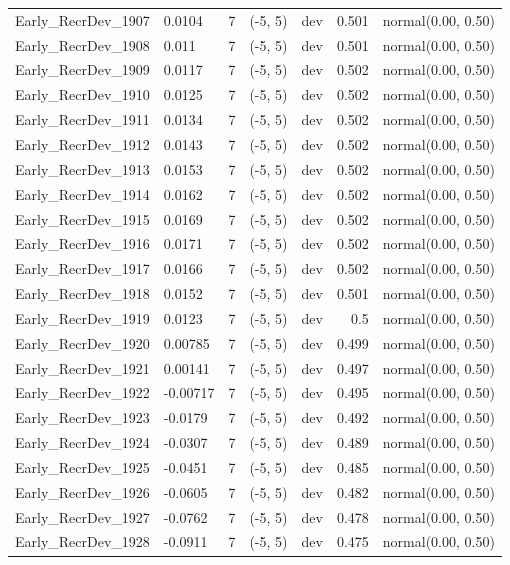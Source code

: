 \documentclass[
]{scrartcl}
\begin{document}
\begin{landscape}
\begin{longtable}{llrllrl}
Early\_RecrDev\_1907 & 0.0104 & 7 & (-5, 5) & dev & 0.501 & normal(0.00, 0.50) \\ 
Early\_RecrDev\_1908 & 0.011 & 7 & (-5, 5) & dev & 0.501 & normal(0.00, 0.50) \\ 
Early\_RecrDev\_1909 & 0.0117 & 7 & (-5, 5) & dev & 0.502 & normal(0.00, 0.50) \\ 
Early\_RecrDev\_1910 & 0.0125 & 7 & (-5, 5) & dev & 0.502 & normal(0.00, 0.50) \\ 
Early\_RecrDev\_1911 & 0.0134 & 7 & (-5, 5) & dev & 0.502 & normal(0.00, 0.50) \\ 
Early\_RecrDev\_1912 & 0.0143 & 7 & (-5, 5) & dev & 0.502 & normal(0.00, 0.50) \\ 
Early\_RecrDev\_1913 & 0.0153 & 7 & (-5, 5) & dev & 0.502 & normal(0.00, 0.50) \\ 
Early\_RecrDev\_1914 & 0.0162 & 7 & (-5, 5) & dev & 0.502 & normal(0.00, 0.50) \\ 
Early\_RecrDev\_1915 & 0.0169 & 7 & (-5, 5) & dev & 0.502 & normal(0.00, 0.50) \\ 
Early\_RecrDev\_1916 & 0.0171 & 7 & (-5, 5) & dev & 0.502 & normal(0.00, 0.50) \\ 
Early\_RecrDev\_1917 & 0.0166 & 7 & (-5, 5) & dev & 0.502 & normal(0.00, 0.50) \\ 
Early\_RecrDev\_1918 & 0.0152 & 7 & (-5, 5) & dev & 0.501 & normal(0.00, 0.50) \\ 
Early\_RecrDev\_1919 & 0.0123 & 7 & (-5, 5) & dev & 0.5 & normal(0.00, 0.50) \\ 
Early\_RecrDev\_1920 & 0.00785 & 7 & (-5, 5) & dev & 0.499 & normal(0.00, 0.50) \\ 
Early\_RecrDev\_1921 & 0.00141 & 7 & (-5, 5) & dev & 0.497 & normal(0.00, 0.50) \\ 
Early\_RecrDev\_1922 & -0.00717 & 7 & (-5, 5) & dev & 0.495 & normal(0.00, 0.50) \\ 
Early\_RecrDev\_1923 & -0.0179 & 7 & (-5, 5) & dev & 0.492 & normal(0.00, 0.50) \\ 
Early\_RecrDev\_1924 & -0.0307 & 7 & (-5, 5) & dev & 0.489 & normal(0.00, 0.50) \\ 
Early\_RecrDev\_1925 & -0.0451 & 7 & (-5, 5) & dev & 0.485 & normal(0.00, 0.50) \\ 
Early\_RecrDev\_1926 & -0.0605 & 7 & (-5, 5) & dev & 0.482 & normal(0.00, 0.50) \\ 
Early\_RecrDev\_1927 & -0.0762 & 7 & (-5, 5) & dev & 0.478 & normal(0.00, 0.50) \\ 
Early\_RecrDev\_1928 & -0.0911 & 7 & (-5, 5) & dev & 0.475 & normal(0.00, 0.50) \\ 

\end{longtable}
\end{landscape}
\end{document}
